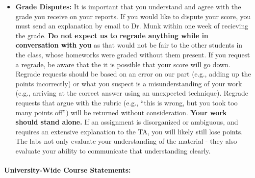\documentclass[11pt, a4paper]{article}
\begin{document}
\begin{itemize}
\item[] \textbf{Grade Disputes:} It is important that you understand and agree
        with the grade you receive on your reports. If you would like
        to dispute your score, you must send an explanation by email to Dr.
        Munk within one week of recieving the grade.
        \textbf{Do not expect us to regrade anything while in conversation with
        you} as that would not be fair to the other students in the class, whose
        homeworks were graded without them present.  If you request a regrade,
        be aware that the it is possible that your score will go down.
        Regrade requests should be based on an error on our part (e.g., adding
        up the points incorrectly) or what you suspect is a misunderstanding of
        your work (e.g., arriving at the correct answer using an unexpected
        technique). Regrade requests that argue with the rubric (e.g., ``this is
        wrong, but you took too many points off'') will be returned without
        consideration.
        \textbf{Your work should stand alone.} If an assignment is disorganized or
        ambiguous, and requires an extensive explanation to the TA, you
        will likely still lose points. The labs not only evaluate your
        understanding of the material - they also evaluate your ability to
        communicate that understanding clearly.
\end{itemize}

\paragraph{University-Wide Course Statements:}
\end{document}
